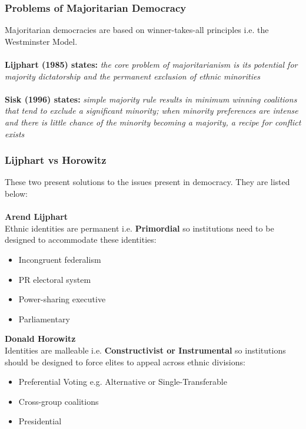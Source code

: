 \documentclass[12pt, letterpaper]{article}
\begin{document}
\subsubsection{Problems of Majoritarian Democracy}
Majoritarian democracies are based on winner-takes-all principles i.e. the Westminster Model.\\\\
\textbf{Lijphart (1985) states:} \textit{the core problem of majoritarianism is its potential for majority dictatorship and the permanent exclusion of ethnic minorities}\\\\
\textbf{Sisk (1996) states:} \textit{simple majority rule results in minimum winning coalitions that tend to exclude a significant minority; when minority preferences are intense and there is little chance of the minority becoming a majority, a recipe for conflict exists}

\subsubsection{Lijphart vs Horowitz}
These two present solutions to the issues present in democracy. They are listed below:\\\\
\textbf{Arend Lijphart}\\
Ethnic identities are permanent i.e. \textbf{Primordial} so institutions need to be designed to accommodate these identities:
\begin{itemize}
	\item Incongruent federalism
	\item PR electoral system
	\item Power-sharing executive
	\item Parliamentary
\end{itemize}
\textbf{Donald Horowitz}\\
Identities are malleable i.e. \textbf{Constructivist or Instrumental} so institutions should be designed to force elites to appeal across ethnic divisions:
\begin{itemize}
	\item Preferential Voting e.g. Alternative or Single-Transferable
	\item Cross-group coalitions
	\item Presidential
\end{itemize}
\end{document}
